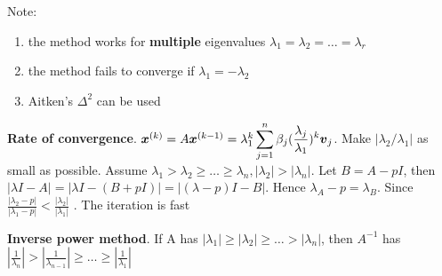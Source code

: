 \documentclass[11pt]{article}
\begin{document}
    Note:
    \begin{enumerate}
    \item the method works for \textbf{multiple} eigenvalues
      \(\lambda_1=\lambda_2=\dots=\lambda_r\)
    \item the method fails to converge if \(\lambda_1=-\lambda_2\)
    \item Aitken's \(\Delta^2\) can be used
    \end{enumerate}


    \textbf{Rate of convergence}. \(\boldsymbol{x}^{(k)}=A\boldsymbol{x}^{(k-1)}=\lambda_1^k
    \displaystyle\sum_{j=1}^n\beta_j(\frac{\lambda_j}{\lambda_1})^k\boldsymbol{v}_j\).
    Make \(|\lambda_2/\lambda_1|\) as small as possible.
    Assume \(\lambda_1>\lambda_2\ge\dots\ge\lambda_n, |\lambda_2|>|\lambda_n|\).
    Let \(B=A-pI\), then \(|\lambda I-A|=|\lambda I-(B+pI)|=|(\lambda-p)I-B|\).
    Hence \(\lambda_A-p=\lambda_B\). Since  \(\frac{|\lambda_2-p|}{|\lambda_1-p|}<
    \frac{|\lambda_2|}{|\lambda_1|}\) . The iteration is fast


    \textbf{Inverse power method}. If A has
    \(|\lambda_1|\ge|\lambda_2|\ge\dots>|\lambda_n|\), then \(A^{-1}\) has
    \(|\frac{1}{\lambda_n}|>| \frac{1}{\lambda_{n-1}}|\ge\dots\ge|
    \frac{1}{\lambda_1}|\) 
  
\end{document}
